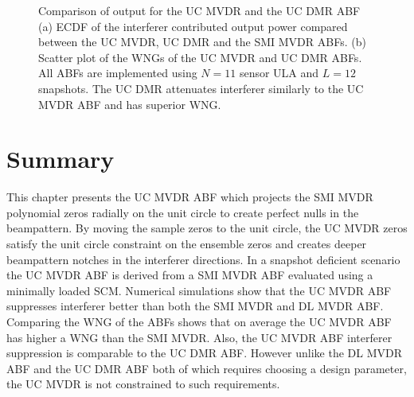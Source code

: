 \begin{figure}[!hp]
  \centering
  \centering

  \caption[Comparison of output for the UC MVDR and the UC DMR ABF.]{Comparison of output for the UC MVDR and the UC DMR ABF (a)
    ECDF of the interferer contributed output power compared between
    the UC MVDR, UC DMR and the SMI MVDR ABFs. (b) Scatter plot of the
    WNGs of the UC MVDR and UC DMR ABFs. All ABFs are implemented
    using $N = 11$ sensor ULA and $L = 12$ snapshots. The UC DMR attenuates interferer similarly to the UC MVDR ABF and has superior WNG.}
  \label{fig:uc-mvdr-dmr-pout}
\end{figure}

\section{Summary}
\label{sec:ch3-summary}
This chapter presents the UC MVDR ABF which projects the SMI MVDR
polynomial zeros radially on the unit circle to create perfect nulls
in the beampattern. By moving the sample zeros to the
unit circle, the UC MVDR zeros satisfy the unit circle constraint on
the ensemble zeros and creates deeper beampattern notches in the
interferer directions. In a snapshot deficient scenario the UC MVDR
ABF is derived from a SMI MVDR ABF evaluated using a minimally loaded
SCM. Numerical simulations show that the UC MVDR ABF suppresses
interferer better than both the SMI MVDR and DL MVDR ABF. Comparing
the WNG of the ABFs shows that on average the UC MVDR ABF has
higher a WNG than the SMI MVDR. Also, the UC MVDR ABF interferer
suppression is comparable to the UC DMR ABF. However unlike the DL MVDR ABF and the UC DMR ABF both of which requires choosing a design parameter,
the UC MVDR is not constrained to such requirements.
